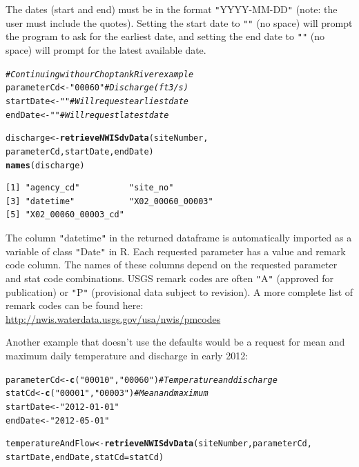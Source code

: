 \documentclass[a4paper,11pt]{article}\usepackage[]{graphicx}\usepackage[]{color}
\makeatletter
\newcommand{\hlstr}[1]{\textcolor[rgb]{0.192,0.494,0.8}{#1}}%
\newcommand{\hlcom}[1]{\textcolor[rgb]{0.678,0.584,0.686}{\textit{#1}}}%
\newcommand{\hlstd}[1]{\textcolor[rgb]{0.345,0.345,0.345}{#1}}%
\newcommand{\hlkwb}[1]{\textcolor[rgb]{0.69,0.353,0.396}{#1}}%
\newcommand{\hlkwc}[1]{\textcolor[rgb]{0.333,0.667,0.333}{#1}}%
\newcommand{\hlkwd}[1]{\textcolor[rgb]{0.737,0.353,0.396}{\textbf{#1}}}%
\newenvironment{kframe}{%
 \def\at@end@of@kframe{}%
 \ifinner\ifhmode%
  \def\at@end@of@kframe{\end{minipage}}%
  \begin{minipage}{\columnwidth}%
 \fi\fi%
 \def\FrameCommand##1{\hskip\@totalleftmargin \hskip-\fboxsep
 \colorbox{shadecolor}{##1}\hskip-\fboxsep
     \hskip-\linewidth \hskip-\@totalleftmargin \hskip\columnwidth}%
 \MakeFramed {\advance\hsize-\width
   \@totalleftmargin\z@ \linewidth\hsize
   \@setminipage}}%
 {\par\unskip\endMakeFramed%
 \at@end@of@kframe}
\newenvironment{knitrout}{}{} %
\makeatother
\begin{document}
The dates (start and end) must be in the format \texttt{"}YYYY-MM-DD\texttt{"} (note: the user must include the quotes).  Setting the start date to \texttt{"}\texttt{"} (no space) will prompt the program to ask for the earliest date, and setting the end date to \texttt{"}\texttt{"} (no space) will prompt for the latest available date.

\begin{knitrout}
\color{fgcolor}\begin{kframe}
\begin{alltt}
\hlcom{# Continuing with our Choptank River example}
\hlstd{parameterCd} \hlkwb{<-} \hlstr{"00060"}  \hlcom{# Discharge (ft3/s)}
\hlstd{startDate} \hlkwb{<-} \hlstr{""}  \hlcom{# Will request earliest date}
\hlstd{endDate} \hlkwb{<-} \hlstr{""} \hlcom{# Will request latest date}

\hlstd{discharge} \hlkwb{<-} \hlkwd{retrieveNWISdvData}\hlstd{(siteNumber,}
                    \hlstd{parameterCd, startDate, endDate)}
\hlkwd{names}\hlstd{(discharge)}
\end{alltt}
\begin{verbatim}
[1] "agency_cd"          "site_no"           
[3] "datetime"           "X02_00060_00003"   
[5] "X02_00060_00003_cd"
\end{verbatim}
\end{kframe}
\end{knitrout}

The column \texttt{"}datetime\texttt{"} in the returned dataframe is automatically imported as a variable of class \texttt{"}Date\texttt{"} in R. Each requested parameter has a value and remark code column.  The names of these columns depend on the requested parameter and stat code combinations. USGS remark codes are often \texttt{"}A\texttt{"} (approved for publication) or \texttt{"}P\texttt{"} (provisional data subject to revision). A more complete list of remark codes can be found here:
\url{http://nwis.waterdata.usgs.gov/usa/nwis/pmcodes}

Another example that doesn't use the defaults would be a request for mean and maximum daily temperature and discharge in early 2012:
\begin{knitrout}
\color{fgcolor}\begin{kframe}
\begin{alltt}
\hlstd{parameterCd} \hlkwb{<-} \hlkwd{c}\hlstd{(}\hlstr{"00010"}\hlstd{,}\hlstr{"00060"}\hlstd{)}  \hlcom{# Temperature and discharge}
\hlstd{statCd} \hlkwb{<-} \hlkwd{c}\hlstd{(}\hlstr{"00001"}\hlstd{,}\hlstr{"00003"}\hlstd{)}  \hlcom{# Mean and maximum}
\hlstd{startDate} \hlkwb{<-} \hlstr{"2012-01-01"}
\hlstd{endDate} \hlkwb{<-} \hlstr{"2012-05-01"}

\hlstd{temperatureAndFlow} \hlkwb{<-} \hlkwd{retrieveNWISdvData}\hlstd{(siteNumber, parameterCd,}
        \hlstd{startDate, endDate,} \hlkwc{statCd}\hlstd{=statCd)}
\end{alltt}
\end{kframe}
\end{knitrout}
\end{document}

